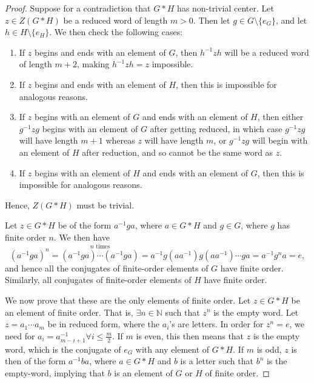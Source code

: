 \documentclass{article}
\begin{document}
\begin{proof}
Suppose for a contradiction that $G*H$ has non-trivial center. Let $z\in Z(G*H)$ be a reduced word of length $m > 0$. Then let $g\in G\setminus\{e_G\}$, and let $h\in H\setminus\{e_H\}$. We then check the following cases:
\begin{enumerate}
    \item If $z$ begins and ends with an element of $G$, then $h^{-1}zh$ will be a reduced word of length $m+2$, making $h^{-1}zh=z$ impossible.
    \item If $z$ begins and ends with an element of $H$, then this is impossible for analogous reasons.
    \item If $z$ begins with an element of $G$ and ends with an element of $H$, then either $g^{-1}zg$ begins with an element of $G$ after getting reduced, in which case $g^{-1}zg$ will have length $m+1$ whereas $z$ will have length $m$, or $g^{-1}zg$ will begin with an element of $H$ after reduction, and so cannot be the same word as $z$.
    \item If $z$ begins with an element of $H$ and ends with an element of $G$, then this is impossible for analogous reasons.
\end{enumerate}
Hence, $Z(G*H)$ must be trivial.

Let $z\in G*H$ be of the form $a^{-1}ga$, where $a\in G*H$ and $g\in G$, where $g$ has finite order $n$. We then have \[(a^{-1}ga)^n=\overset{n\text{ times}}{(a^{-1}ga)\cdots (a^{-1}ga)}=a^{-1}g(aa^{-1})g(aa^{-1})\cdots ga=a^{-1}g^na=e,\] and hence all the conjugates of finite-order elements of $G$ have finite order. Similarly, all conjugates of finite-order elements of $H$ have finite order.

We now prove that these are the only elements of finite order. Let $z\in G*H$ be an element of finite order. That is, $\exists n\in\mathbb{N}$ such that $z^n$ is the empty word. Let $z=a_1\cdots a_m$ be in reduced form, where the $a_i$'s are letters. In order for $z^n=e$, we need for $a_i=a_{m-i+1}^{-1}\forall i \leq\frac{m}{2}$. If $m$ is even, this then means that $z$ is the empty word, which is the conjugate of $e_G$ with any element of $G*H$. If $m$ is odd, $z$ is then of the form $a^{-1}ba$, where $a\in G*H$ and $b$ is a letter such that $b^n$ is the empty-word, implying that $b$ is an element of $G$ or $H$ of finite order.
\end{proof}
\end{document}
